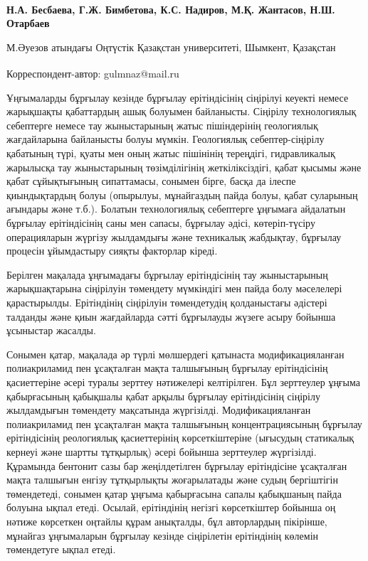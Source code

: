 
\begin{articleheader}

{\bfseries
Н.А. Бесбаева,
Г.Ж. Бимбетова\textsuperscript{\envelope },
К.С. Надиров,
М.Қ. Жантасов,
Н.Ш. Отарбаев
}
\end{articleheader}

\begin{affiliation}
М.Әуезов атындағы Оңтүстік Қазақстан университеті, Шымкент, Қазақстан

\raggedright \textsuperscript{\envelope } Корреспондент-автор: gulmnaz@mail.ru
\end{affiliation}

Ұңғымаларды бұрғылау кезінде бұрғылау ерітіндісінің сіңірілуі кеуекті
немесе жарықшақты қабаттардың ашық болуымен байланысты. Сіңірілу
технологиялық себептерге немесе тау жыныстарының жатыс пішіндерінің
геологиялық жағдайларына байланысты болуы мүмкін. Геологиялық
себептер-сіңірілу қабатының түрі, қуаты мен оның жатыс пішінінің
тереңдігі, гидравликалық жарылысқа тау жыныстарының төзімділігінің
жеткіліксіздігі, қабат қысымы және қабат сұйықтығының сипаттамасы,
сонымен бірге, басқа да ілеспе қиындықтардың болуы (опырылуы,
мұнайгаздың пайда болуы, қабат суларының ағындары және т.б.). Болатын
технологиялық себептерге ұңғымаға айдалатын бұрғылау ерітіндісінің саны
мен сапасы, бұрғылау әдісі, көтеріп-түсіру операцияларын жүргізу
жылдамдығы және техникалық жабдықтау, бұрғылау процесін ұйымдастыру
сияқты факторлар кіреді.

Берілген мақалада ұңғымадағы бұрғылау ерітіндісінің тау жыныстарының
жарықшақтарына сіңірілуін төмендету мүмкіндігі мен пайда болу мәселелері
қарастырылды. Ерітіндінің сіңірілуін төмендетудің қолданыстағы әдістері
талданды және қиын жағдайларда сәтті бұрғылауды жүзеге асыру бойынша
ұсыныстар жасалды.

Сонымен қатар, мақалада әр түрлі мөлшердегі қатынаста модификацияланған
полиакриламид пен ұсақталған мақта талшығының бұрғылау ерітіндісінің
қасиеттеріне әсері туралы зерттеу нәтижелері келтірілген. Бұл зерттеулер
ұңғыма қабырғасының қабықшалы қабат арқылы бұрғылау ерітіндісінің
сіңірілу жылдамдығын төмендету мақсатында жүргізілді. Модификацияланған
полиакриламид пен ұсақталған мақта талшығының концентрациясының бұрғылау
ерітіндісінің реологиялық қасиеттерінің көрсеткіштеріне (ығысудың
статикалық кернеуі және шартты тұтқырлық) әсері бойынша зерттеулер
жүргізілді. Құрамында бентонит сазы бар жеңілдетілген бұрғылау
ерітіндісіне ұсақталған мақта талшығын енгізу тұтқырлықты жоғарылатады
және судың бергіштігін төмендетеді, сонымен қатар ұңғыма қабырғасына
сапалы қабықшаның пайда болуына ықпал етеді. Осылай, ерітіндінің негізгі
көрсеткіштер бойынша оң нәтиже көрсеткен оңтайлы құрам анықталды, бұл
авторлардың пікірінше, мұнайгаз ұңғымаларын бұрғылау кезінде сіңірілетін
ерітіндінің көлемін төмендетуге ықпал етеді.


